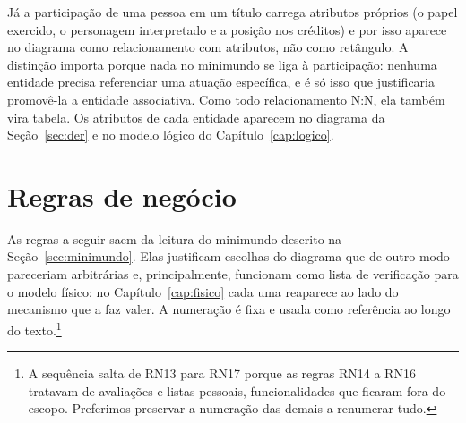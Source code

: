 \documentclass[a4paper,12pt,oneside,openany]{book}
\begin{document}
Já a participação de uma pessoa em um título carrega atributos próprios (o
papel exercido, o personagem interpretado e a posição nos créditos) e por isso
aparece no diagrama como relacionamento com atributos, não como
retângulo. A distinção importa porque nada no minimundo se liga à
participação: nenhuma entidade precisa referenciar uma atuação específica, e é
só isso que justificaria promovê-la a entidade associativa. Como todo
relacionamento N:N, ela também vira tabela. Os atributos de cada entidade
aparecem no diagrama da Seção~\ref{sec:der} e no modelo lógico do
Capítulo~\ref{cap:logico}.

\section{Regras de negócio}\label{sec:regras}


As regras a seguir saem da leitura do minimundo descrito na
Seção~\ref{sec:minimundo}. Elas justificam escolhas do diagrama que de outro
modo pareceriam arbitrárias e, principalmente, funcionam como lista de
verificação para o modelo físico: no Capítulo~\ref{cap:fisico} cada uma
reaparece ao lado do mecanismo que a faz valer. A numeração é fixa e usada como referência ao longo do
texto.\footnote{A sequência salta de RN13 para RN17 porque as regras RN14 a
RN16 tratavam de avaliações e listas pessoais, funcionalidades que ficaram
fora do escopo. Preferimos preservar a numeração das demais a renumerar tudo.}
\end{document}
